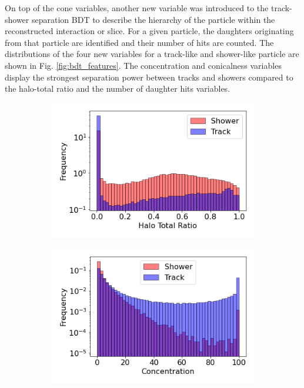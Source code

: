 On top of the cone variables, another new variable was introduced to the track-shower separation BDT to describe the hierarchy of the particle within the reconstructed interaction or slice.
For a given particle, the daughters originating from that particle are identified and their number of hits are counted.
The distributions of the four new variables for a track-like and shower-like particle are shown in Fig. \ref{fig:bdt_features}.
The concentration and conicalness variables display the strongest separation power between tracks and showers compared to the halo-total ratio and the number of daughter hits variables.

\begin{figure}[bp!]
        \centering
        \begin{subfigure}[b]{0.45\textwidth}
            \centering
            \includegraphics[width=\textwidth]{Feature_Halo_Total_Ratio}
            \caption{}%
        \end{subfigure}
        \hfill
        \begin{subfigure}[b]{0.45\textwidth}  
            \centering 
            \includegraphics[width=\textwidth]{Feature_Concentration}

\end{subfigure}
\end{figure}
